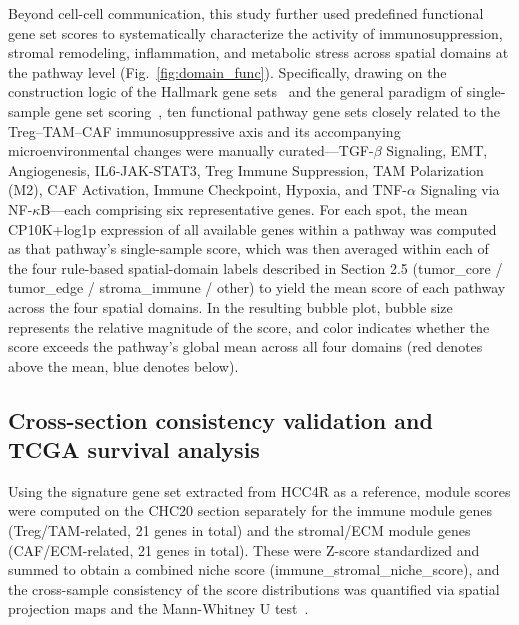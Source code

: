 \documentclass[12pt, a4paper]{article}
\begin{document}
Beyond cell-cell communication, this study further used predefined functional gene set scores to systematically characterize the activity of immunosuppression, stromal remodeling, inflammation, and metabolic stress across spatial domains at the pathway level (Fig.~\ref{fig:domain_func}). Specifically, drawing on the construction logic of the Hallmark gene sets~\citep{liberzon2015molecular} and the general paradigm of single-sample gene set scoring~\citep{barbie2009systematic}, ten functional pathway gene sets closely related to the Treg--TAM--CAF immunosuppressive axis and its accompanying microenvironmental changes were manually curated—TGF-$\beta$ Signaling, EMT, Angiogenesis, IL6-JAK-STAT3, Treg Immune Suppression, TAM Polarization (M2), CAF Activation, Immune Checkpoint, Hypoxia, and TNF-$\alpha$ Signaling via NF-$\kappa$B—each comprising six representative genes. For each spot, the mean CP10K+log1p expression of all available genes within a pathway was computed as that pathway's single-sample score, which was then averaged within each of the four rule-based spatial-domain labels described in Section 2.5 (tumor\_core / tumor\_edge / stroma\_immune / other) to yield the mean score of each pathway across the four spatial domains. In the resulting bubble plot, bubble size represents the relative magnitude of the score, and color indicates whether the score exceeds the pathway's global mean across all four domains (red denotes above the mean, blue denotes below).

\subsection{Cross-section consistency validation and TCGA survival analysis}

Using the signature gene set extracted from HCC4R as a reference, module scores were computed on the CHC20 section separately for the immune module genes (Treg/TAM-related, 21 genes in total) and the stromal/ECM module genes (CAF/ECM-related, 21 genes in total). These were Z-score standardized and summed to obtain a combined niche score (immune\_stromal\_niche\_score), and the cross-sample consistency of the score distributions was quantified via spatial projection maps and the Mann-Whitney U test~\citep{mann1947test}.
\end{document}
